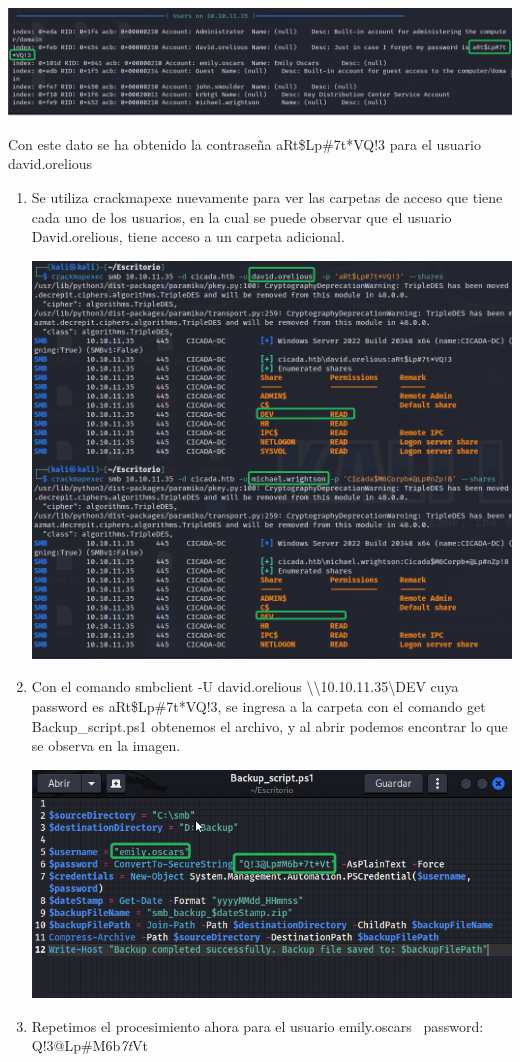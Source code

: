 \documentclass[
  letterpaper,
  DIV=11,
  numbers=noendperiod]{scrreprt}
\begin{document}
\includegraphics{Unidades/unidad10/imagenes/12.png}

Con este dato se ha obtenido la contraseña aRt\$Lp\#7t*VQ!3 para el
usuario david.orelious

\begin{enumerate}
\def\labelenumi{\arabic{enumi})}
\setcounter{enumi}{8}
\item
  Se utiliza crackmapexe nuevamente para ver las carpetas de acceso que
  tiene cada uno de los usuarios, en la cual se puede observar que el
  usuario David.orelious, tiene acceso a un carpeta adicional.

  \includegraphics{Unidades/unidad10/imagenes/13.png}
\item
  Con el comando smbclient -U david.orelious
  \textbackslash\textbackslash10.10.11.35\textbackslash DEV cuya
  password es aRt\$Lp\#7t*VQ!3, se ingresa a la carpeta con el comando
  get Backup\_script.ps1 obtenemos el archivo, y al abrir podemos
  encontrar lo que se observa en la imagen.

  \includegraphics{Unidades/unidad10/imagenes/14.png}
\item
  Repetimos el procesimiento ahora para el usuario emily.oscars
  ~password: Q!3@Lp\#M6b\emph{7t}Vt


\end{enumerate}
\end{document}

